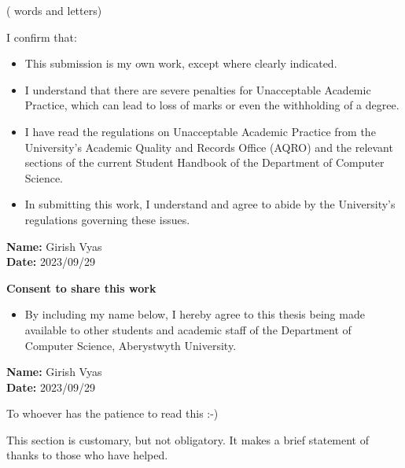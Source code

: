 \documentclass{main}
\newcounter{wordcount}
\newcounter{lettercount}
\begin{document}
\begin{singlespace}
  \endcountem
  (\thewordcount{} words and \thelettercount{} letters)


  I confirm that:\\
  \begin{itemize}
    \item This submission is my own work, except where clearly indicated.
    \item I understand that there are severe penalties for Unacceptable Academic Practice, which can lead to loss of marks or even the withholding of a degree.
    \item I have read the regulations on Unacceptable Academic Practice from the University’s Academic Quality and Records Office (AQRO) and the relevant    sections of the current Student Handbook of the Department of Computer Science.
    \item In submitting this work, I understand and agree to abide by the University’s regulations governing these issues.
  \end{itemize}
  \vspace{10pt}
  \textbf{Name:} Girish Vyas\\
  \textbf{Date:} 2023/09/29
  \vspace{50pt}

  \begin{center}
    \textbf{Consent to share this work}
  \end{center}
  \begin{itemize}
    \item By including my name below, I hereby agree to this thesis being made available to other students and academic staff of the Department of Computer Science, Aberystwyth University.
  \end{itemize}

  \vspace{10pt}
  \textbf{Name:} Girish Vyas\\
  \textbf{Date:} 2023/09/29






  \null\vskip1.5in
  \begin{center}

    To whoever has the patience to read this :-)

    This section is customary, but not obligatory.  It makes a brief statement of thanks to those who have helped.

  \end{center}

  \afterpreface

\end{singlespace}
\end{document}
